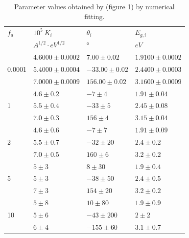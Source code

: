 \documentclass[10pt, 3p, sort&compress]{elsarticle}
\begin{document}
\begin{table}[thbp]
\tiny
\begin{tabular}{ p{1cm}|p{}|p{}| p{}}
\toprule
 $f_a$ & $10^5 \ K_i$ & $\theta _i$ &  $E_{g,i}$\\
 & $A^{1/2} \cdot eV^{1/2}$ & ° & $eV$\\
\midrule
\multirow{3}{*}{0.0001} & $4.6000 \pm 0.0002$    & $7.00 \pm 0.02$ &   $1.9100 \pm 0.0002$\\
                                   & $5.4000 \pm 0.0004$    & $-33.00 \pm 0.02$ &   $2.4400 \pm 0.0003$\\
                                   & $7.0000 \pm 0.0009$    & $156.00 \pm 0.02$ &   $3.1600 \pm 0.0009$\\
                                   
\midrule
\multirow{3}{*}{1}        & $4.6 \pm 0.2$    & $-7 \pm 4$ &   $1.91 \pm 0.04$\\
                                   & $5.5 \pm 0.4$    & $-33 \pm 5$ &   $2.45 \pm 0.08$\\
                                   & $7.0 \pm 0.3$    & $156 \pm 4$ &   $3.15 \pm 0.04$\\
                                  
\midrule
\multirow{3}{*}{2}        & $4.6 \pm 0.6$    & $-7 \pm 7$ &   $1.91 \pm 0.09$\\
                                   & $5.5 \pm 0.7$    & $-32 \pm 20$ &   $2.4 \pm 0.2$\\
                                   & $7.0 \pm 0.5$    & $160 \pm 6$ &   $3.2 \pm 0.2$\\      
                                   
\midrule
\multirow{3}{*}{5}        & $5 \pm 3$    & $8 \pm 30$ &   $1.9 \pm 0.4$\\
                                   & $5 \pm 3$    & $-38 \pm 50$ &   $2.4 \pm 0.5$\\
                                   & $7 \pm 3$    & $154 \pm 20$ &   $3.2 \pm 0.2$\\        
                                   
\midrule
\multirow{3}{*}{10}        & $5 \pm 8$    & $10 \pm 80$ &   $1.9 \pm 0.9$\\
                                   & $5 \pm 6$    & $-43 \pm 200$ &   $2 \pm 2$\\
                                   & $6 \pm 4$    & $-155 \pm 60$ &   $3.1 \pm 0.7$\\                                   


\bottomrule
\end{tabular}
\caption{Parameter values obtained by \citet{petit2013} (figure 1) by numerical fitting.}
\label{table:result_fit_noise}
\end{table}
\end{document}
